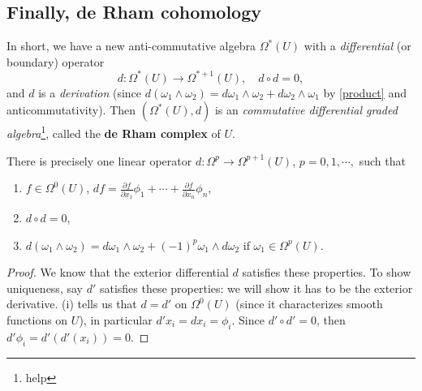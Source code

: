 \subsection{Finally, de Rham cohomology}
In short, we have a new anti-commutative algebra $\Omega^*(U)$ with a \emph{differential} (or boundary) operator \[
    d \colon \Omega^*(U) \to \Omega ^{*+1}(U),\quad d\circ d=0,
\] and $d$ is a \emph{derivation} (since $d(\omega_1\wedge \omega_2)=d\omega_1\wedge \omega_2+d\omega_2\wedge \omega_1$ by \cref{product} and anticommutativity). Then $(\Omega^*(U),d)$ is an \emph{commutative differential graded algebra}\footnote{help}, called the \textbf{de Rham complex} of $U$.

\begin{theorem}
    There is precisely one linear operator $d \colon \Omega^p \to \Omega^{p+1}(U)$, $p=0,1,\cdots ,$ such that 
    \begin{enumerate}[label=(\roman*)]
        \setlength\itemsep{-.2em}
    \item $f \in \Omega^0(U)$, $df=\frac{\partial f}{\partial x_1}\phi_1+ \cdots + \frac{\partial f}{\partial x_n }\phi_n $,
    \item $d \circ d=0$,
    \item $d(\omega_1\wedge \omega_2)=d\omega_1\wedge \omega_2+(-1)^p\omega_1\wedge d\omega_2$ if $\omega_1 \in \Omega^p(U)$.
    \end{enumerate}
\end{theorem}
\begin{proof}
    We know that the exterior differential $d$ satisfies these properties. To show uniqueness, say $d'$ satisfies these properties: we will show it has to be the exterior derivative. (i) tells us that $d=d'$ on $\Omega^0(U)$ (since it characterizes smooth functions on $U$), in particular $d'x_i =dx_i =\phi_i $. Since $d' \circ d'=0$, then $d'\phi_i=d'(d'(x_i ))=0 $.
\end{proof}

